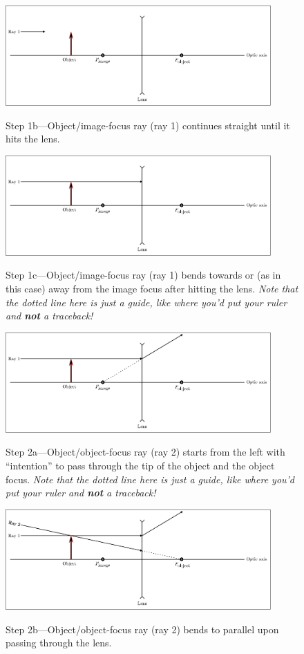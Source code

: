 \documentclass[letterpaper,10pt]{article}
\newenvironment{myindentpar}[1]
{\begin{list}{}
	{\setlength{\leftmargin}{#1}}
	\setlength{\parskip}{10pt}
	\item[]
}
{\end{list}}
\begin{document}
{\begin{myindentpar}{20pt}
\begin{figure}[htb]
  	{\includegraphics[width=4in,left]{ray_diagram_howto_step05_ray1a.pdf}}
 \end{figure}
 \begin{figure}[htb]
	{Step 1b---Object/image-focus ray (ray 1) continues straight until it hits the lens.}

  	{\includegraphics[width=4in,left]{ray_diagram_howto_step06_ray1b.pdf}}
 \end{figure}
 \begin{figure}[htb]
   {Step 1c---Object/image-focus ray (ray 1) bends towards or (as in this case) away from the image focus after hitting the lens. \textit{Note that the dotted line here is just a guide, like where you'd put your ruler and \textbf{not} a traceback!}}

  	{\includegraphics[width=4in,left]{ray_diagram_howto_step07_ray1c.pdf}}
 \end{figure}
 \begin{figure}[htb]
	{Step 2a---Object/object-focus ray (ray 2) starts from the left with ``intention'' to pass through the tip of the object and the object focus. \textit{Note that the dotted line here is just a guide, like where you'd put your ruler and \textbf{not} a traceback!}}

  	{\includegraphics[width=4in,left]{ray_diagram_howto_step08_ray2a.pdf}}
 \end{figure}
 \begin{figure}[htb]
	{Step 2b---Object/object-focus ray (ray 2) bends to parallel upon passing through the lens.}


\end{figure}
\end{myindentpar}}
\end{document}
